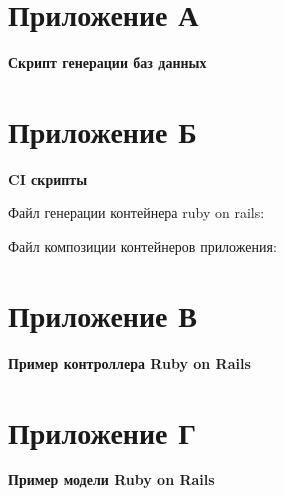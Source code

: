 \section*{Приложение А}
{
	\begin{center}
	\textbf{Скрипт генерации баз данных}
	\end{center}
	
	\newpage
}

\newpage
{}
{}

\section*{Приложение Б}
{
	\begin{center}
	\textbf{CI скрипты}
	\end{center}
  Файл генерации контейнера ruby on rails:
	
	\newpage
  Файл композиции контейнеров приложения:
  
  \newpage
}

\newpage
{}
{}

\section*{Приложение В}
{
	\begin{center}
	\textbf{Пример контроллера Ruby on Rails}
	\end{center}
	
	\newpage
}

\newpage
{}
{}

\section*{Приложение Г}
{
	\begin{center}
	\textbf{Пример модели Ruby on Rails}
	\end{center}
	
	\newpage
}


